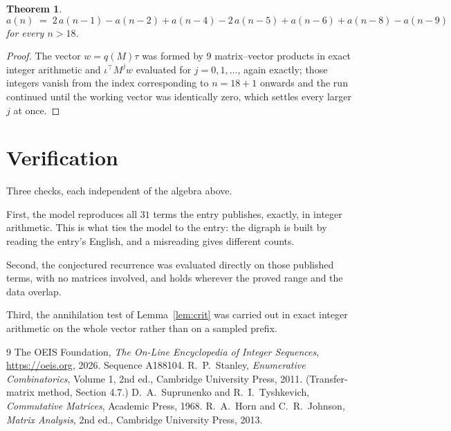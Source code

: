 \documentclass[11pt,a4paper]{article}
\theoremstyle{plain}
\newtheorem{theorem}{Theorem}
\theoremstyle{definition}
\begin{document}
\begin{theorem}
\[
a(n)\;=\;2\,a(n-1) - a(n-2) + a(n-4) - 2\,a(n-5) + a(n-6) + a(n-8) - a(n-9)
\]
for every $n>18$.
\end{theorem}

\begin{proof}
The vector $w=q(M)\tau$ was formed by $9$ matrix--vector products in exact integer
arithmetic and $\iota^{\!\top}M^{j}w$ evaluated for $j=0,1,\dots$, again exactly; those
integers vanish from the index corresponding to $n=18+1$ onwards and the run continued
until the working vector was identically zero, which settles every larger $j$ at once.
\end{proof}

\section{Verification}

Three checks, each independent of the algebra above.

First, the model reproduces all $31$ terms the entry publishes, exactly, in integer
arithmetic. This is what ties the model to the entry: the digraph is built by reading the
entry's English, and a misreading gives different counts.

Second, the conjectured recurrence was evaluated directly on those published terms, with no
matrices involved, and holds wherever the proved range and the data overlap.

Third, the annihilation test of Lemma~\ref{lem:crit} was carried out in exact integer
arithmetic on the whole vector rather than on a sampled prefix.

\begin{thebibliography}{9}
 The OEIS Foundation, \emph{The On-Line Encyclopedia of Integer
Sequences}, \url{https://oeis.org}, 2026. Sequence A188104.
 R.~P.~Stanley, \emph{Enumerative Combinatorics}, Volume 1, 2nd ed.,
Cambridge University Press, 2011. (Transfer-matrix method, Section 4.7.)
 D.~A.~Suprunenko and R.~I.~Tyshkevich, \emph{Commutative Matrices},
Academic Press, 1968.
 R.~A.~Horn and C.~R.~Johnson, \emph{Matrix Analysis}, 2nd ed., Cambridge
University Press, 2013.
\end{thebibliography}
\end{document}
